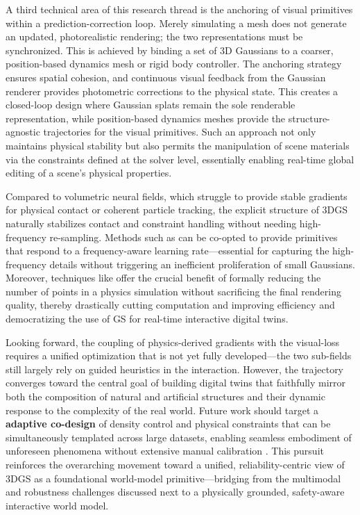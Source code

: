 \documentclass[11pt,a4paper]{article}
\begin{document}
A third technical area of this research thread is the anchoring of visual primitives within a prediction-correction loop. Merely simulating a mesh does not generate an updated, photorealistic rendering; the two representations must be synchronized. This is achieved by binding a set of 3D Gaussians to a coarser, position-based dynamics mesh or rigid body controller. The anchoring strategy ensures spatial cohesion, and continuous visual feedback from the Gaussian renderer provides photometric corrections to the physical state. This creates a closed-loop design where Gaussian splats remain the sole renderable representation, while position-based dynamics meshes provide the structure-agnostic trajectories for the visual primitives. Such an approach not only maintains physical stability but also permits the manipulation of scene materials via the constraints defined at the solver level, essentially enabling real-time global editing of a scene's physical properties.

Compared to volumetric neural fields, which struggle to provide stable gradients for physical contact or coherent particle tracking, the explicit structure of 3DGS naturally stabilizes contact and constraint handling without needing high-frequency re-sampling. Methods such as \cite{arxiv:2503.07000v1} can be co-opted to provide primitives that respond to a frequency-aware learning rate---essential for capturing the high-frequency details without triggering an inefficient proliferation of small Gaussians. Moreover, techniques like \cite{arxiv:2505.05587v1} offer the crucial benefit of formally reducing the number of points in a physics simulation without sacrificing the final rendering quality, thereby drastically cutting computation and improving efficiency and democratizing the use of GS for real-time interactive digital twins.

Looking forward, the coupling of physics-derived gradients with the visual-loss requires a unified optimization that is not yet fully developed---the two sub-fields still largely rely on guided heuristics in the interaction. However, the trajectory converges toward the central goal of building digital twins that faithfully mirror both the composition of natural and artificial structures and their dynamic response to the complexity of the real world. Future work should target a \textbf{adaptive co-design} of density control and physical constraints that can be simultaneously templated across large datasets, enabling seamless embodiment of unforeseen phenomena without extensive manual calibration \cite{arxiv:2404.06109v1,arxiv:2503.14274v1}. This pursuit reinforces the overarching movement toward a unified, reliability-centric view of 3DGS as a foundational world-model primitive---bridging from the multimodal and robustness challenges discussed next to a physically grounded, safety-aware interactive world model.
\end{document}
